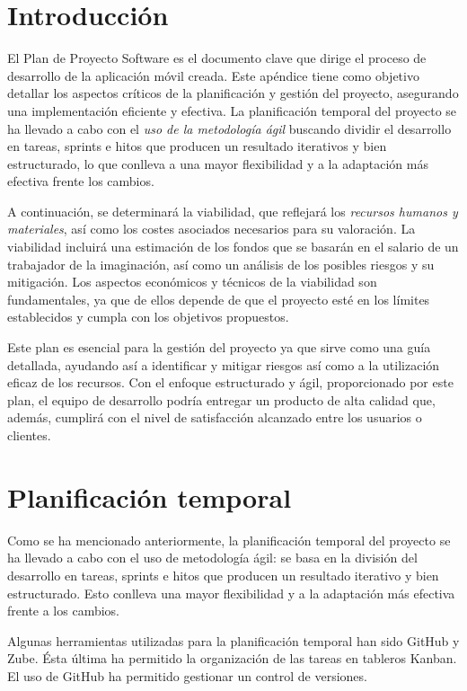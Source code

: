 
\section{Introducción}
El Plan de Proyecto Software es el documento clave que dirige el proceso de desarrollo de la aplicación móvil creada. Este apéndice tiene como objetivo detallar los aspectos críticos de la planificación y gestión del proyecto, asegurando una implementación eficiente y efectiva.
La planificación temporal del proyecto se ha llevado a cabo con el \emph{uso de la metodología ágil} buscando dividir el desarrollo en tareas, sprints e hitos que producen un resultado iterativos y bien estructurado, lo que conlleva a una mayor flexibilidad y a la adaptación más efectiva frente los cambios. 

A continuación, se determinará la viabilidad, que reflejará los \emph{recursos humanos y materiales}, así como los costes asociados necesarios para su valoración. La viabilidad incluirá una estimación de los fondos que se basarán en el salario de un trabajador de la imaginación, así como un análisis de los posibles riesgos y su mitigación. Los aspectos económicos y técnicos de la viabilidad son fundamentales, ya que de ellos depende de que el proyecto esté en los límites establecidos y cumpla con los objetivos propuestos.

Este plan es esencial para la gestión del proyecto ya que sirve como una guía detallada, ayudando así a identificar y mitigar riesgos así como a la utilización eficaz de los recursos. Con el enfoque estructurado y ágil, proporcionado por este plan, el equipo de desarrollo podría entregar un producto de alta calidad que, además, cumplirá con el nivel de satisfacción alcanzado entre los usuarios o clientes. 
\section{Planificación temporal}
 Como se ha mencionado anteriormente, la planificación temporal del proyecto se ha llevado a cabo con el uso de metodología ágil: se basa en la división del desarrollo en tareas, sprints e hitos que producen un resultado iterativo y bien estructurado. Esto conlleva una mayor flexibilidad y a la adaptación más efectiva frente a los cambios.

 Algunas herramientas utilizadas para la planificación temporal han sido GitHub y Zube. Ésta última ha permitido la organización de las tareas en tableros Kanban. El uso de GitHub ha permitido gestionar un control de versiones.

